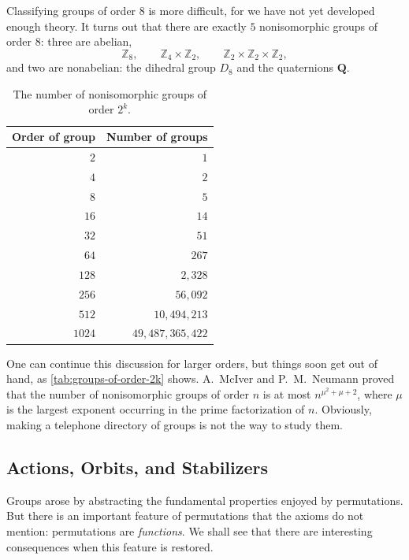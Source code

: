 Classifying groups of order \(8\) is more difficult, for we have not yet developed enough
theory. It turns out that there are exactly \(5\) nonisomorphic groups of order \(8\):
three are abelian,
\[
	\mathbb Z_8, \qquad \mathbb Z_4 \times \mathbb Z_2, \qquad
	\mathbb Z_2 \times \mathbb Z_2 \times \mathbb Z_2,
\]
and two are nonabelian: the dihedral group \(D_8\) and the quaternions \(\mathbf Q\).

\begin{table}[H]
	\centering
	\begin{tabular}{rr}
		\toprule
		Order of group & Number of groups \\
		\midrule
		\(2\)    & \(1\)              \\
		\(4\)    & \(2\)              \\
		\(8\)    & \(5\)              \\
		\(16\)   & \(14\)             \\
		\(32\)   & \(51\)             \\
		\(64\)   & \(267\)            \\
		\(128\)  & \(2{,}328\)        \\
		\(256\)  & \(56{,}092\)       \\
		\(512\)  & \(10{,}494{,}213\) \\
		\(1024\) & \(49{,}487{,}365{,}422\) \\
		\bottomrule
	\end{tabular}
	\caption{The number of nonisomorphic groups of order \(2^k\).}
	\label{tab:groups-of-order-2k}
\end{table}

One can continue this discussion for larger orders, but things soon get out of hand, as
\autoref{tab:groups-of-order-2k} shows. A.~McIver and P.~M.~Neumann proved that the number
of nonisomorphic groups of order \(n\) is at most \(n^{\mu^2+\mu+2}\), where \(\mu\) is
the largest exponent occurring in the prime factorization of \(n\). Obviously, making a
telephone directory of groups is not the way to study them.

\subsection{Actions, Orbits, and Stabilizers}

Groups arose by abstracting the fundamental properties enjoyed by permutations. But there
is an important feature of permutations that the axioms do not mention: permutations are
\emph{functions}. We shall see that there are interesting consequences when this feature
is restored.

